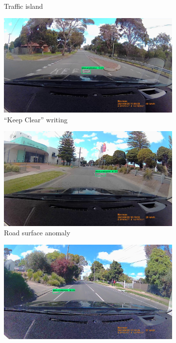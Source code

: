 \documentclass[11pt,twoside]{report}
\begin{document}
\begin{figure}[h]
\begin{subfigure}{0.3\textwidth}
	\caption{Traffic island}
\end{subfigure}
\hfill
\begin{subfigure}{0.3\textwidth}
	\includegraphics[width=\textwidth]{f005_false_positive_writing.jpg}
	\caption{``Keep Clear'' writing}
\end{subfigure}
\hfill
\begin{subfigure}{0.3\textwidth}
	\includegraphics[width=\textwidth]{f005_false_positive_defect1.jpg}
	\caption{Road surface anomaly}
\end{subfigure}
\hfill
\begin{subfigure}{0.3\textwidth}
	\includegraphics[width=\textwidth]{f005_false_positive_service_hatch.jpg}

\end{subfigure}
\end{figure}
\end{document}
